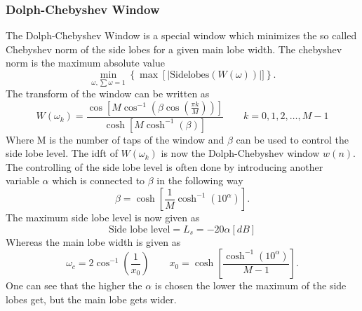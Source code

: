 \subsubsection{Dolph-Chebyshev Window}
The Dolph-Chebyshev Window is a special window which minimizes the so called Chebyshev norm of the side lobes for a given main lobe width. The chebyshev norm is the maximum absolute value
\begin{equation}
    \min_{\omega, \sum \omega = 1} \left \{ \max \left[ | \text{Sidelobes}(W(\omega))\right | ]\right \}.
\end{equation}
The transform of the window can be written as
\begin{equation}
    W(\omega_k) = \frac{\cos{ \left [ M \cos^{-1}{\left ( \beta \cos{ \left (\frac{\pi k}{M} \right )} \right)}\right ]}}{\cosh{\left [ M \cosh^{-1}{\left ( \beta \right ) }\right ]}} \qquad k = 0,1,2, \dots, M-1
\end{equation}
Where M is the number of taps of the window and $\beta$ can be used to control the side lobe level.
The  \acrfull{idft} of $W(\omega_k)$ is now the Dolph-Chebyshev window $w(n)$.
The controlling of the side lobe level is often done by introducing another variable $\alpha$ which is connected to $\beta$ in the following way
\begin{equation}
    \beta = \cosh{\left [ \frac{1}{M} \cosh^{-1}{\left ( 10^{\alpha} \right ) } \right ]}.
\end{equation}
The maximum side lobe level is now given as
\begin{equation}
    \text{Side lobe level} = L_s =  -20\alpha [dB]
\end{equation}
Whereas the main lobe width is given as
\begin{equation}
    \omega_c = 2 \cos^{-1}{ \left ( \frac{1}{x_0} \right )} \qquad x_0 = \cosh{ \left [ \frac{\cosh^{-1}{\left ( 10^{\alpha} \right )}}{M-1}\right ]}.
\end{equation}
One can see that the higher the $\alpha$ is chosen the lower the maximum of the side lobes get, but the main lobe gets wider. 





